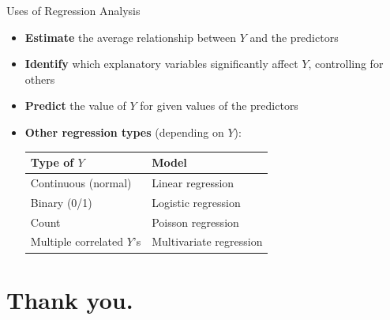 \documentclass[12pt, aspectratio=169]{beamer}
\begin{document}
    \begin{frame}{Uses of Regression Analysis}
        \begin{itemize}
            \item \textbf{Estimate} the average relationship between $Y$ and the predictors
            \item \textbf{Identify} which explanatory variables significantly affect $Y$, controlling for others
            \item \textbf{Predict} the value of $Y$ for given values of the predictors
            \item \textbf{Other regression types} (depending on $Y$):
            \begin{center}
                \small
                \begin{tabular}{ll}
                    \toprule
                    \textbf{Type of $Y$} & \textbf{Model} \\
                    \midrule
                    Continuous (normal) & Linear regression \\
                    Binary (0/1) & Logistic regression \\
                    Count & Poisson regression \\
                    Multiple correlated $Y$'s & Multivariate regression \\
                    \bottomrule
                \end{tabular}
            \end{center}
        \end{itemize}
    \end{frame}




    \section*{Thank you.}
\end{document}
